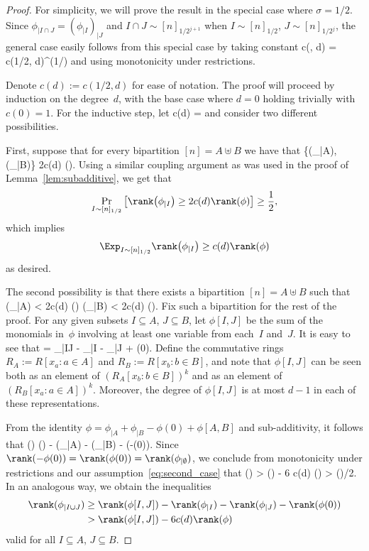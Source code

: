 \begin{proof}
For simplicity, we will prove the result in the special case where $\sigma=1/2$.
Since $\phi_{|I\cap J} = (\phi_{|I})_{|J}$ and $I\cap J \sim [n]_{1/2^{j+1}}$ when $I\sim [n]_{1/2}$, $J\sim [n]_{1/2^j}$, the general case easily follows from this special case by taking constant
\beqn
c(\sigma, d) = c(1/2, d)^{\lceil\log(1/\sigma)\rceil}
\eeqn
and using monotonicity under restrictions.

Denote $c(d) := c(1/2, d)$ for ease of notation.
The proof will proceed by induction on the degree~$d$, with the base case where $d=0$ holding trivially with $c(0) = 1$.
For the inductive step, let
\beqn
c(d) = 
\eeqn
and consider two different possibilities.

First, suppose that for every bipartition $[n] = A\uplus B$ we have that
\beqn
\max \big\{\rank(\phi_{|A}),\, \rank(\phi_{|B})\big\} \geq 2c(d) \rank(\phi).
\eeqn
Using a similar coupling argument as was used in the proof of Lemma~\ref{lem:subadditive}, we get that
\begin{align*} \Pr_{I\sim[n]_{1/2}}\big[\rank\big(\phi_{|I}\big) \geq 2c(d)\rank(\phi)\big] \geq \frac{1}{2},
\end{align*}
which implies
\begin{equation*}
    \Exp_{I\sim [n]_{1/2}}\rank\big(\phi_{|I}\big) \geq c(d)\rank(\phi)
\end{equation*}
as desired.

The second possibility is that there exists a bipartition $[n] = A\uplus B$ such that
\beq \label{eq:second_case}
\rank(\phi_{|A}) < 2c(d) \rank(\phi) \quad {} \quad \rank(\phi_{|B}) < 2c(d) \rank(\phi).
\eeq
Fix such a bipartition for the rest of the proof.
For any given subsets $I\subseteq A$, $J\subseteq B$, let $\phi[I, J]$ be the sum of the monomials in~$\phi$ involving at least one variable from each~$I$ and~$J$.
It is easy to see that
\beqn
\phi[I, J] = \phi_{|I\cup J} - \phi_{|I} - \phi_{|J} + \phi(0).
\eeqn
Define the commutative rings $R_A := R[x_a: a\in A]$ and $R_B := R[x_b: b\in B]$, and note that $\phi[I, J]$ can be seen both as an element of $(R_A[x_b: b\in B])^k$ and as an element of $(R_B[x_a: a\in A])^k$.
Moreover, the degree of $\phi[I, J]$ is at most $d-1$ in each of these representations.

From the identity $\phi = \phi_{|A} + \phi_{|B} - \phi(0) + \phi[A, B]$ and sub-additivity, it follows that
\beqn
\rank(\phi[A, B]) \geq \rank(\phi) - \rank(\phi_{|A}) - \rank(\phi_{|B}) - \rank(-\phi(0)).
\eeqn
Since $\rank(-\phi(0)) = \rank(\phi(0)) = \rank(\phi_{|\emptyset})$, we conclude from monotonicity under restrictions and our assumption~\eqref{eq:second_case} that
\beq\label{eq:phiAB}
\rank(\phi[A, B]) > \rank(\phi) - 6 c(d) \rank(\phi) > \rank(\phi)/2.
\eeq
In an analogous way, we obtain the inequalities
\begin{align} \label{eq:phi_IJ}
    \rank(\phi_{|I\cup J}) &\geq \rank(\phi[I, J]) - \rank(\phi_{|I}) - \rank(\phi_{|J}) - \rank(\phi(0)) \\
    &> \rank(\phi[I, J]) - 6 c(d) \rank(\phi) \notag
\end{align}
valid for all $I\subseteq A$, $J\subseteq B$.


\end{proof}
